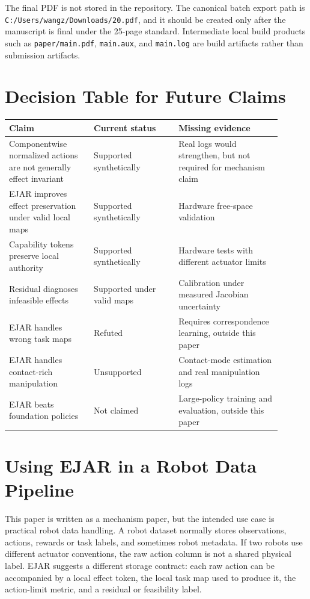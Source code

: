 \documentclass{article}
\begin{document}
The final PDF is not stored in the repository. The canonical batch export path is \texttt{C:/Users/wangz/Downloads/20.pdf}, and it should be created only after the manuscript is final under the 25-page standard. Intermediate local build products such as \texttt{paper/main.pdf}, \texttt{main.aux}, and \texttt{main.log} are build artifacts rather than submission artifacts.

\section{Decision Table for Future Claims}

\begin{center}
\begin{tabular}{p{0.28\linewidth}p{0.28\linewidth}p{0.34\linewidth}}
\toprule
Claim & Current status & Missing evidence \\
\midrule
Componentwise normalized actions are not generally effect invariant & Supported synthetically & Real logs would strengthen, but not required for mechanism claim \\
EJAR improves effect preservation under valid local maps & Supported synthetically & Hardware free-space validation \\
Capability tokens preserve local authority & Supported synthetically & Hardware tests with different actuator limits \\
Residual diagnoses infeasible effects & Supported under valid maps & Calibration under measured Jacobian uncertainty \\
EJAR handles wrong task maps & Refuted & Requires correspondence learning, outside this paper \\
EJAR handles contact-rich manipulation & Unsupported & Contact-mode estimation and real manipulation logs \\
EJAR beats foundation policies & Not claimed & Large-policy training and evaluation, outside this paper \\
\bottomrule
\end{tabular}
\end{center}

\clearpage
\section{Using EJAR in a Robot Data Pipeline}

This paper is written as a mechanism paper, but the intended use case is practical robot data handling. A robot dataset normally stores observations, actions, rewards or task labels, and sometimes robot metadata. If two robots use different actuator conventions, the raw action column is not a shared physical label. EJAR suggests a different storage contract: each raw action can be accompanied by a local effect token, the local task map used to produce it, the action-limit metric, and a residual or feasibility label.
\end{document}
